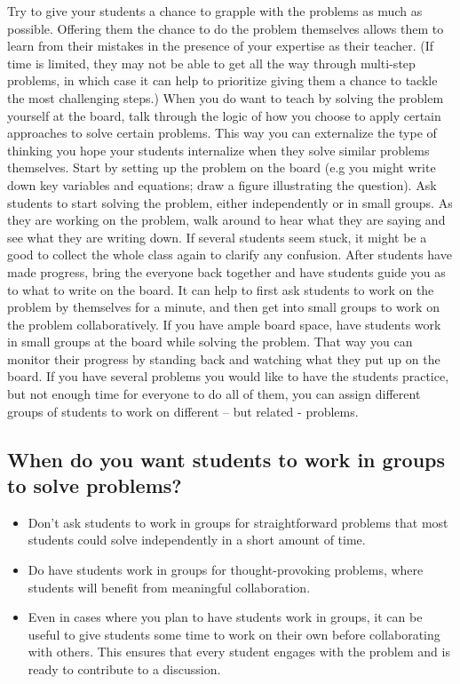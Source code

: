 Try to give your students a chance to grapple with the problems as much as possible.  Offering them the chance to do the problem themselves allows them to learn from their mistakes in the presence of your expertise as their teacher. (If time is limited, they may not be able to get all the way through multi-step problems, in which case it can help to prioritize giving them a chance to tackle the most challenging steps.)
When you do want to teach by solving the problem yourself at the board, talk through the logic of how you choose to apply certain approaches to solve certain problems.  This way you can externalize the type of thinking you hope your students internalize when they solve similar problems themselves.
Start by setting up the problem on the board (e.g you might write down key variables and equations; draw a figure illustrating the question).  Ask students to start solving the problem, either independently or in small groups.  As they are working on the problem, walk around to hear what they are saying and see what they are writing down. If several students seem stuck, it might be a good to collect the whole class again to clarify any confusion.  After students have made progress, bring the everyone back together and have students guide you as to what to write on the board.
It can help to first ask students to work on the problem by themselves for a minute, and then get into small groups to work on the problem collaboratively.
If you have ample board space, have students work in small groups at the board while solving the problem.  That way you can monitor their progress by standing back and watching what they put up on the board.
If you have several problems you would like to have the students practice, but not enough time for everyone to do all of them, you can assign different groups of students to work on different – but related - problems.

\subsection{When do you want students to work in groups to solve problems?}
\label{sec:when-do-you}

\begin{itemize}
\item Don’t ask students to work in groups for straightforward problems that most students could solve independently in a short amount of time.
  
\item Do have students work in groups for thought-provoking problems, where students will benefit from meaningful collaboration.
  
\item Even in cases where you plan to have students work in groups, it can be useful to give students some time to work on their own before collaborating with others.  This ensures that every student engages with the problem and is ready to contribute to a discussion.
\end{itemize}



